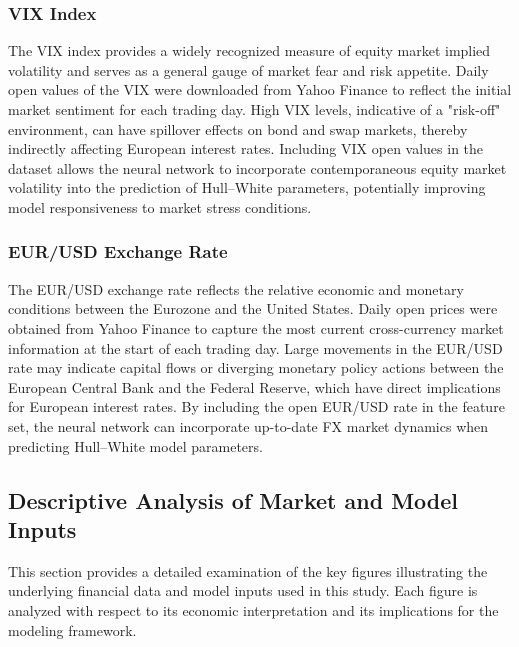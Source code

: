 \subsubsection{VIX Index}
The VIX index provides a widely recognized measure of equity market implied volatility and serves as a general gauge of market fear and risk appetite. Daily open values of the VIX were downloaded from Yahoo Finance to reflect the initial market sentiment for each trading day. High VIX levels, indicative of a "risk-off" environment, can have spillover effects on bond and swap markets, thereby indirectly affecting European interest rates. Including VIX open values in the dataset allows the neural network to incorporate contemporaneous equity market volatility into the prediction of Hull–White parameters, potentially improving model responsiveness to market stress conditions.

\subsubsection{EUR/USD Exchange Rate}
The EUR/USD exchange rate reflects the relative economic and monetary conditions between the Eurozone and the United States. Daily open prices were obtained from Yahoo Finance to capture the most current cross-currency market information at the start of each trading day. Large movements in the EUR/USD rate may indicate capital flows or diverging monetary policy actions between the European Central Bank and the Federal Reserve, which have direct implications for European interest rates. By including the open EUR/USD rate in the feature set, the neural network can incorporate up-to-date FX market dynamics when predicting Hull–White model parameters.

\subsection{Descriptive Analysis of Market and Model Inputs}
This section provides a detailed examination of the key figures illustrating the underlying financial data and model inputs used in this study. Each figure is analyzed with respect to its economic interpretation and its implications for the modeling framework.

